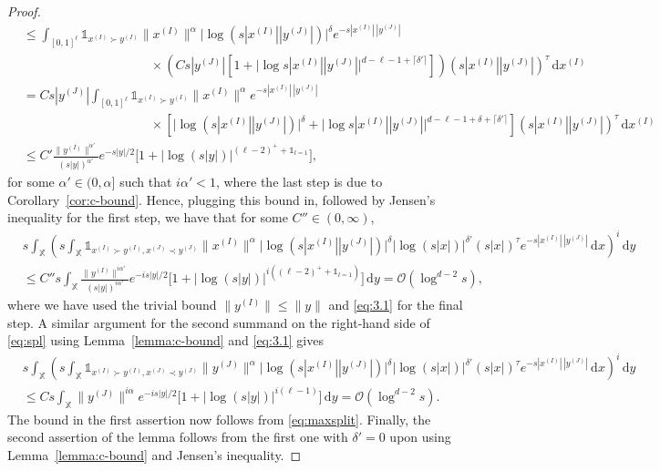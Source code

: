 \documentclass[11pt,reqno]{amsart}
\numberwithin{equation}{section}
\theoremstyle{definition}
\newcommand{\XX}{\mathbb{X}}
\newcommand{\diff}{{\,\mathrm d}}
\begin{document}
\begin{proof}
\begin{align*}
	&\le \int_{[0,1]^\ell}  \mathds{1}_{x^{(I)} \succ y^{(I)}}  \|x^{(I)}\|^\alpha \big| \log (s|x^{(I)}| |y^{(J)}|)\big|^\delta e^{-s |x^{(I)}|\,|y^{(J)}|} \\
	& \qquad \qquad \qquad \qquad \qquad \times \left(C s|y^{(J)}|\left[1+\big|\log s|x^{(I)}||y^{(J)}|\big|^{d-\ell-1+\lceil\delta'\rceil}\right]\right) (s|x^{(I)}||y^{(J)}|)^\tau \diff x^{(I)}\\
	&= C s|y^{(J)}| \int_{[0,1]^\ell}  \mathds{1}_{x^{(I)} \succ y^{(I)}}  \|x^{(I)}\|^\alpha e^{-s |x^{(I)}|\,|y^{(J)}|}\\
	& \qquad \qquad \qquad\qquad \qquad \times\left[ \big| \log (s|x^{(I)}| |y^{(J)}|)\big|^\delta + \big|\log s|x^{(I)}||y^{(J)}|\big|^{d-\ell-1 +\delta+\lceil\delta'\rceil} \right]  (s|x^{(I)}||y^{(J)}|)^\tau \diff x^{(I)}\\
	&\le C' \frac{\|y^{(I)}\|^{\alpha'}}{(s|y|)^{\alpha'}} e^{-s|y|/2}\Big[1+\big|\log(s|y|)\big|^{(\ell-2)^+ + \mathds{1}_{l=1}}\Big],
	\end{align*}
	for some $\alpha' \in (0,\alpha]$ such that $i\alpha'<1$, where the last step is due to Corollary~\ref{cor:c-bound}. Hence, plugging this bound in, followed by Jensen's inequality for the first step, we have that for some $C''\in (0,\infty)$,
	\begin{align*}
	& s\int_{\XX}  \left(s \int_\XX \mathds{1}_{x^{(I)} \succ y^{(I)}, x^{(J)} \prec y^{(J)}} \|x^{(I)}\|^\alpha
	 \big| \log (s|x^{(I)}| |y^{(J)}|)\big|^\delta \big| \log (s|x|)\big|^{\delta'} (s|x|)^\tau e^{-s |x^{(I)}|\,|y^{(J)}|} \diff x\right)^i \diff y\\
	&\le C'' s \int_{\XX}\frac{\|y^{(I)}\|^{i\alpha'}}{(s|y|)^{i\alpha'}} e^{-i
		s|y|/2}\Big[1+\big|\log(s|y|)\big|^{i((\ell-2)^+ + \mathds{1}_{l=1})}\Big]\diff y =\mathcal{O}(\log^{d-2} s),
	\end{align*}
	where we have used the trivial bound $\|y^{(I)}\| \le \|y\|$ and \eqref{eq:3.1} for the final step. A similar argument for the second summand on the right-hand side of \eqref{eq:spl} using Lemma~\ref{lemma:c-bound} and \eqref{eq:3.1} gives
	\begin{align*}
	& s\int_{\XX} \left(s \int_\XX \mathds{1}_{x^{(I)} \succ y^{(I)}, x^{(J)} \prec y^{(J)}} \|y^{(J)}\|^\alpha
	 \big| \log (s|x^{(I)}| |y^{(J)}|)\big|^\delta \big| \log (s|x|)\big|^{\delta'} (s|x|)^\tau e^{-s |x^{(I)}|\,|y^{(J)}|} \diff x\right)^i \diff y\\
	& \le  C s \int_{\XX}\|y^{(J)}\|^{i \alpha} e^{-i
		s|y|/2}\Big[1+\big|\log(s|y|)\big|^{i(\ell-1)}\Big]\diff y=\mathcal{O}(\log^{d-2} s).
	\end{align*}
	The bound in the first assertion now follows from \eqref{eq:maxsplit}.
	Finally, the second assertion of the lemma follows from the first one with $\delta'=0$ upon using Lemma~\ref{lemma:c-bound} and Jensen's inequality. 
\end{proof}
\end{document}
